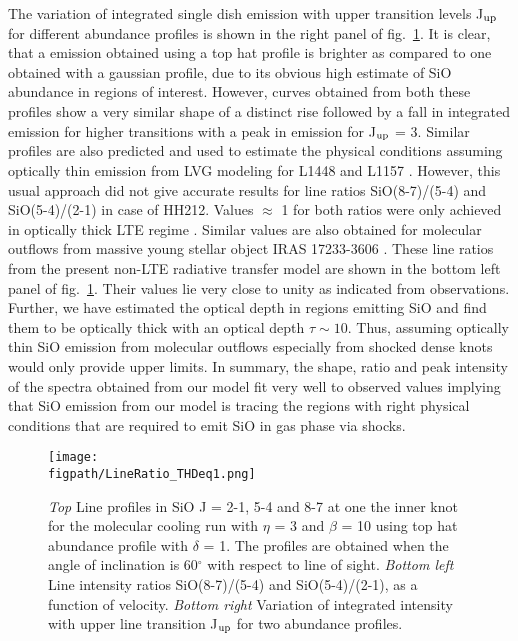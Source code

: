 \documentclass[useAMS,usenatbib,letters]{mn2e}
\newcommand{\figpath}{PFIGS/}
\begin{document}
The variation of integrated single dish emission with upper transition
levels J$_{\rm up}$ for different abundance profiles is shown in the
right panel of fig.~\ref{fig:lineratio}. It is clear, that a emission
obtained using a top hat profile is brighter as compared to one
obtained with a gaussian profile, due to its obvious high estimate of
SiO abundance in regions of interest. However, curves obtained from
both these profiles show a very similar shape of a distinct rise followed by a fall in
integrated emission for higher transitions with a peak in
emission for J$_{\rm up}$ = 3. Similar profiles are also predicted and
used to estimate the physical conditions assuming optically
thin emission from LVG modeling for L1448 and L1157
\cite{Nisini:2007p13128}. However, this usual approach did not give
accurate results for line ratios SiO(8-7)/(5-4) and SiO(5-4)/(2-1)
in case of HH212. Values $\approx$ 1 for both ratios were
only achieved in optically thick LTE regime
\citep{Cabrit:2007p13804, Lee:2008p13697}. 
Similar values are also obtained for molecular outflows from massive
young stellar object IRAS 17233-3606 \cite{Leurini:2013p13165}.
These line ratios from the present
non-LTE radiative transfer model are shown in the bottom left panel of
fig.~\ref{fig:lineratio}. Their values lie very close to unity as
indicated from observations. Further, we have estimated the optical
depth in regions emitting SiO and find them to be optically thick with
an optical depth $\tau \sim 10$. Thus, assuming optically thin SiO emission
from molecular outflows especially from shocked dense knots would
only provide upper limits. In summary, the
shape, ratio and peak intensity of the spectra obtained from our model
fit very well to observed values implying
that SiO emission from our model is tracing the regions with right physical
conditions that are required to emit SiO in gas phase via shocks. 

\begin{figure*}
 \texttt{[image: \\figpath/LineRatio\_THDeq1.png]}
 \caption{{\em{Top}} Line profiles in SiO J = 2-1, 5-4 and 8-7 at one
   the inner knot for the molecular cooling run with $\eta$ = 3 and
   $\beta$ = 10 using top hat abundance profile with $\delta$ = 1. The profiles are
   obtained when the angle of inclination is 60$^{\circ}$ with respect
 to line of sight. {\em{Bottom left}} Line intensity ratios SiO(8-7)/(5-4)
and SiO(5-4)/(2-1), as a function of velocity. {\em{Bottom right}}
Variation of integrated intensity with upper line transition J$_{\rm
  up}$ for two abundance profiles.}
\label{fig:lineratio}
\end{figure*}
\end{document}
